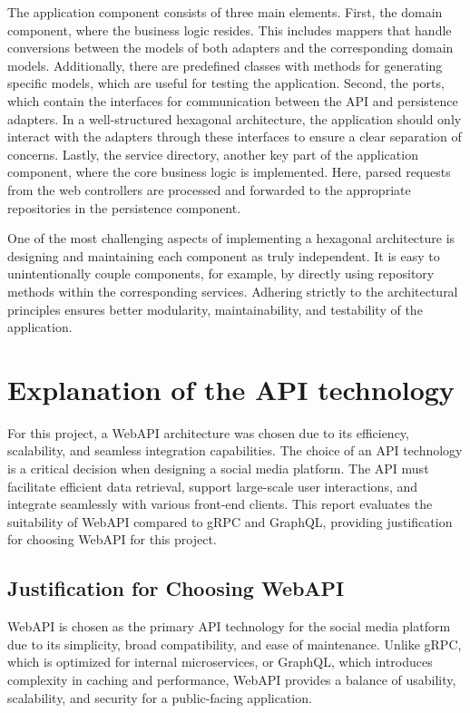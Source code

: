 \documentclass[a4paper, 11pt]{article}
\begin{document}
    The application component consists of three main elements. First, the domain component, where the business logic resides. This includes mappers that handle conversions between the models of both adapters and the corresponding domain models. Additionally, there are predefined classes with methods for generating specific models, which are useful for testing the application. Second, the ports, which contain the interfaces for communication between the API and persistence adapters. In a well-structured hexagonal architecture, the application should only interact with the adapters through these interfaces to ensure a clear separation of concerns. Lastly, the service directory, another key part of the application component, where the core business logic is implemented. Here, parsed requests from the web controllers are processed and forwarded to the appropriate repositories in the persistence component.


    One of the most challenging aspects of implementing a hexagonal architecture is designing and maintaining each component as truly independent. It is easy to unintentionally couple components, for example, by directly using repository methods within the corresponding services. Adhering strictly to the architectural principles ensures better modularity, maintainability, and testability of the application.


    \section{Explanation of the API technology} \label{sec:explanation-of-the-api-technology}
    For this project, a WebAPI architecture was chosen due to its efficiency, scalability, and seamless integration capabilities.
    The choice of an API technology is a critical decision when designing a social media platform. The API must facilitate efficient data retrieval, support large-scale user interactions, and integrate seamlessly with various front-end clients. This report evaluates the suitability of WebAPI compared to gRPC and GraphQL, providing justification for choosing WebAPI for this project.

    \subsection{Justification for Choosing WebAPI}
    WebAPI is chosen as the primary API technology for the social media platform due to its simplicity, broad compatibility, and ease of maintenance. Unlike gRPC, which is optimized for internal microservices, or GraphQL, which introduces complexity in caching and performance, WebAPI provides a balance of usability, scalability, and security for a public-facing application.
\end{document}
